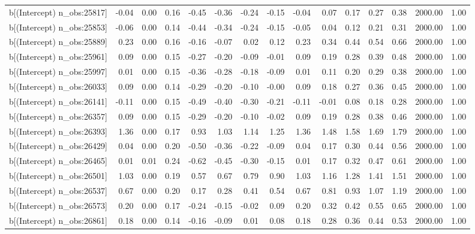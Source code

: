 \begin{table}[ht]
\begin{tabular}{rrrrrrrrrrrrrrr}
  b[(Intercept) n\_obs:25817] & -0.04 & 0.00 & 0.16 & -0.45 & -0.36 & -0.24 & -0.15 & -0.04 & 0.07 & 0.17 & 0.27 & 0.38 & 2000.00 & 1.00 \\ 
  b[(Intercept) n\_obs:25853] & -0.06 & 0.00 & 0.14 & -0.44 & -0.34 & -0.24 & -0.15 & -0.05 & 0.04 & 0.12 & 0.21 & 0.31 & 2000.00 & 1.00 \\ 
  b[(Intercept) n\_obs:25889] & 0.23 & 0.00 & 0.16 & -0.16 & -0.07 & 0.02 & 0.12 & 0.23 & 0.34 & 0.44 & 0.54 & 0.66 & 2000.00 & 1.00 \\ 
  b[(Intercept) n\_obs:25961] & 0.09 & 0.00 & 0.15 & -0.27 & -0.20 & -0.09 & -0.01 & 0.09 & 0.19 & 0.28 & 0.39 & 0.48 & 2000.00 & 1.00 \\ 
  b[(Intercept) n\_obs:25997] & 0.01 & 0.00 & 0.15 & -0.36 & -0.28 & -0.18 & -0.09 & 0.01 & 0.11 & 0.20 & 0.29 & 0.38 & 2000.00 & 1.00 \\ 
  b[(Intercept) n\_obs:26033] & 0.09 & 0.00 & 0.14 & -0.29 & -0.20 & -0.10 & -0.00 & 0.09 & 0.18 & 0.27 & 0.36 & 0.45 & 2000.00 & 1.00 \\ 
  b[(Intercept) n\_obs:26141] & -0.11 & 0.00 & 0.15 & -0.49 & -0.40 & -0.30 & -0.21 & -0.11 & -0.01 & 0.08 & 0.18 & 0.28 & 2000.00 & 1.00 \\ 
  b[(Intercept) n\_obs:26357] & 0.09 & 0.00 & 0.15 & -0.29 & -0.20 & -0.10 & -0.02 & 0.09 & 0.19 & 0.28 & 0.38 & 0.46 & 2000.00 & 1.00 \\ 
  b[(Intercept) n\_obs:26393] & 1.36 & 0.00 & 0.17 & 0.93 & 1.03 & 1.14 & 1.25 & 1.36 & 1.48 & 1.58 & 1.69 & 1.79 & 2000.00 & 1.00 \\ 
  b[(Intercept) n\_obs:26429] & 0.04 & 0.00 & 0.20 & -0.50 & -0.36 & -0.22 & -0.09 & 0.04 & 0.17 & 0.30 & 0.44 & 0.56 & 2000.00 & 1.00 \\ 
  b[(Intercept) n\_obs:26465] & 0.01 & 0.01 & 0.24 & -0.62 & -0.45 & -0.30 & -0.15 & 0.01 & 0.17 & 0.32 & 0.47 & 0.61 & 2000.00 & 1.00 \\ 
  b[(Intercept) n\_obs:26501] & 1.03 & 0.00 & 0.19 & 0.57 & 0.67 & 0.79 & 0.90 & 1.03 & 1.16 & 1.28 & 1.41 & 1.51 & 2000.00 & 1.00 \\ 
  b[(Intercept) n\_obs:26537] & 0.67 & 0.00 & 0.20 & 0.17 & 0.28 & 0.41 & 0.54 & 0.67 & 0.81 & 0.93 & 1.07 & 1.19 & 2000.00 & 1.00 \\ 
  b[(Intercept) n\_obs:26573] & 0.20 & 0.00 & 0.17 & -0.24 & -0.15 & -0.02 & 0.09 & 0.20 & 0.32 & 0.42 & 0.55 & 0.65 & 2000.00 & 1.00 \\ 
  b[(Intercept) n\_obs:26861] & 0.18 & 0.00 & 0.14 & -0.16 & -0.09 & 0.01 & 0.08 & 0.18 & 0.28 & 0.36 & 0.44 & 0.53 & 2000.00 & 1.00 \\ 

\end{tabular}
\end{table}
